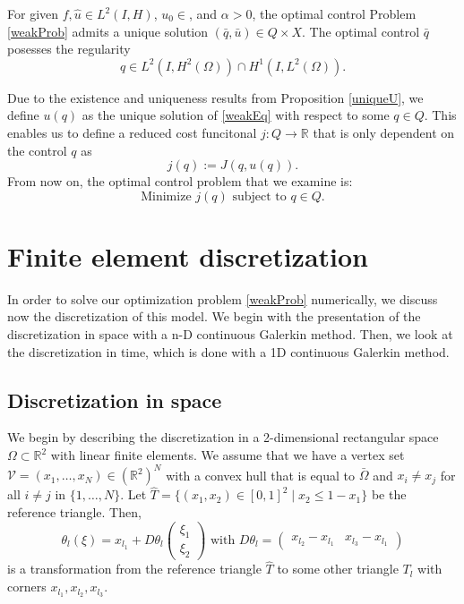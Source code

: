 \begin{prop}
For given $f,\hat{u}\in L^2(I,H)$, $u_0\in $, and $\alpha>0$, the optimal control Problem \eqref{weakProb} admits a unique solution $(\bar{q},\bar{u})\in Q\times X$. The optimal control $\bar{q}$ posesses the regularity
\begin{displaymath}
q\in L^2(I,H^2(\Omega))\cap H^1(I,L^2(\Omega)).
\end{displaymath}
\end{prop}

Due to the existence and uniqueness results from Proposition \ref{uniqueU}, we define $u(q)$ as the unique solution of \eqref{weakEq} with respect to some $q\in Q$. This enables us to define a reduced cost funcitonal $j:Q\to \mathbb{R}$ that is only dependent on the control $q$ as
\begin{displaymath}
j(q):=J(q,u(q)).
\end{displaymath}
From now on, the optimal control problem that we examine is:
\begin{equation}
\label{redProb}
\text{Minimize }j(q)\text{ subject to }q\in Q.
\end{equation}

\section{Finite element discretization}
In order to solve our optimization problem \eqref{weakProb} numerically, we discuss now the discretization of this model. We begin with the presentation of the discretization in space with a n-D continuous Galerkin method. Then, we look at the discretization in time, which is done with a 1D continuous Galerkin method.

\subsection{Discretization in space}
We begin by describing the discretization in a 2-dimensional rectangular space $\Omega\subset\mathbb{R}^2$ with linear finite elements. We assume that we have a vertex set $\mathcal{V}=(x_1,\dotsc,x_N)\in(\mathbb{R}^2)^N$ with a convex hull that is equal  to $\bar{\Omega}$ and $x_i\neq x_j$ for all $i\neq j$ in $\{1,\dotsc,N\}$. Let $\hat{T}=\{(x_1,x_2)\in[0,1]^2\mid x_2 \leq 1-x_1\}$ be the reference triangle. Then,
\begin{displaymath}
\theta_l(\xi)=x_{l_1} + D\theta_l \begin{pmatrix} \xi_1 \\ \xi_2 \end{pmatrix} \text{ with } D\theta_l = \begin{pmatrix} x_{l_2}-x_{l_1} & x_{l_3}-x_{l_1} \end{pmatrix}
\end{displaymath}
is a transformation from the reference triangle $\hat{T}$ to some other triangle $T_l$ with corners $x_{l_1}, x_{l_2}, x_{l_3}$.

